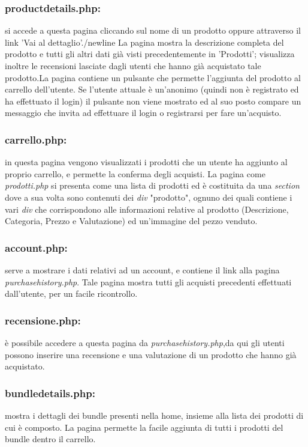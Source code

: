 \subsubsection{productdetails.php:} \Spazio si accede a questa pagina cliccando sul nome di un prodotto oppure attraverso il link 'Vai al dettaglio'./newline La pagina mostra la descrizione completa del prodotto e tutti gli altri dati già visti precedentemente in 'Prodotti'; visualizza inoltre le recensioni lasciate dagli utenti che hanno già acquistato tale prodotto.\newline La pagina contiene un pulsante che permette l'aggiunta del prodotto al carrello dell'utente. Se l'utente attuale è un'anonimo (quindi non è registrato ed ha effettuato il login) il pulsante non viene mostrato ed al suo posto compare un messaggio che invita ad effettuare il login o registrarsi per fare un'acquisto. 

\subsubsection{carrello.php:} \Spazio in questa pagina vengono visualizzati i prodotti che un utente ha aggiunto al proprio carrello, e permette la conferma degli acquisti. La pagina come \emph{prodotti.php} si presenta come una lista di prodotti ed è costituita da una \emph{section} dove a sua volta sono contenuti dei \emph{div} "prodotto", ognuno dei quali contiene i vari \emph{div} che corrispondono alle informazioni relative al prodotto (Descrizione, Categoria, Prezzo e Valutazione) ed un'immagine del pezzo venduto.

\subsubsection{account.php:} \Spazio serve a mostrare i dati relativi ad un account, e contiene il link alla pagina \textit{purchasehistory.php}.
Tale pagina mostra tutti gli acquisti precedenti effettuati dall'utente, per un facile ricontrollo.

\subsubsection{recensione.php:} \Spazio è possibile accedere a questa pagina da \textit{purchasehistory.php},da qui gli utenti possono inserire una recensione e una valutazione di un prodotto che hanno già  acquistato.

\subsubsection{bundledetails.php:} \Spazio mostra i dettagli dei bundle presenti nella home, insieme alla lista dei prodotti di cui è composto. La pagina permette la facile aggiunta di tutti i prodotti del bundle dentro il carrello.

